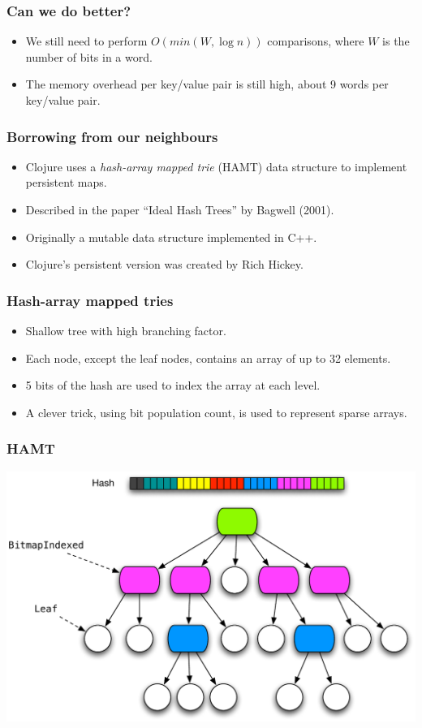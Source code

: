 \documentclass[xetex,mathserif,serif]{beamer}
\newcommand{\code}[1]{\mbox{\texttt{\small{\color{CodeColor}{#1}}}}}
\begin{document}
\begin{frame}
  \frametitle{Can we do better?}
  \begin{itemize}
  \item We still need to perform $O(min(W, \log n))$ \code{Int}
    comparisons, where $W$ is the number of bits in a word.
  \item The memory overhead per key/value pair is still high, about 9
    words per key/value pair.
  \end{itemize}
\end{frame}

\begin{frame}
  \frametitle{Borrowing from our neighbours}
  \begin{itemize}
  \item Clojure uses a \emph{hash-array mapped trie} (HAMT) data
    structure to implement persistent maps.
  \item Described in the paper ``Ideal Hash Trees'' by Bagwell (2001).
  \item Originally a mutable data structure implemented in C++.
  \item Clojure's persistent version was created by Rich Hickey.
  \end{itemize}
\end{frame}

\begin{frame}
  \frametitle{Hash-array mapped tries}
  \begin{itemize}
  \item Shallow tree with high branching factor.
  \item Each node, except the leaf nodes, contains an array of up to
    32 elements.
  \item 5 bits of the hash are used to index the array at each level.
  \item A clever trick, using bit population count, is used to
    represent sparse arrays.
  \end{itemize}
\end{frame}

\begin{frame}
  \frametitle{HAMT}
  \includegraphics[width=\textwidth]{hamt.pdf}
\end{frame}
\end{document}
